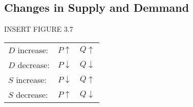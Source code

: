 \subsection{Changes in Supply and Demmand}

INSERT FIGURE 3.7

\begin{tabular}{lll}
	$D$ increase: &$P \uparrow$ 	&$Q \uparrow$	\\
	$D$ decrease: &$P \downarrow$	&$Q \downarrow$	\\
	$S$ increase: &$P \downarrow$	&$Q \uparrow$	\\
	$S$ decrease: &$P \uparrow$ 	&$Q \downarrow$
\end{tabular}
